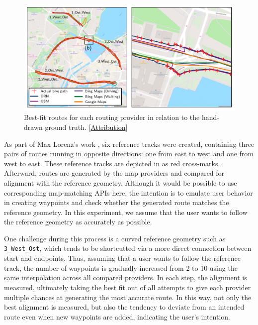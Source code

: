 \begin{figure}[t]
\centering 
\includegraphics[width=\linewidth]{images/routing-hand-drawn-ground-truth.pdf}
\caption{Best-fit routes for each routing provider in relation to the hand-drawn ground truth. [\hyperref[attribution]{Attribution}]}
\label{fig:routing-hand-drawn-ground-truth}
\end{figure}

As part of Max Lorenz's work \cite{lorenz_2022}, six reference tracks were created, containing three pairs of routes running in opposite directions: one from east to west and one from west to east. These reference tracks are depicted in  as red cross-marks. Afterward, routes are generated by the map providers and compared for alignment with the reference geometry. Although it would be possible to use corresponding map-matching APIs here, the intention is to emulate user behavior in creating waypoints and check whether the generated route matches the reference geometry. In this experiment, we assume that the user wants to follow the reference geometry as accurately as possible.

One challenge during this process is a curved reference geometry such as \texttt{3\_West\_Ost}, which tends to be shortcutted via a more direct connection between start and endpoints. Thus, assuming that a user wants to follow the reference track, the number of waypoints is gradually increased from 2 to 10 using the same interpolation across all compared providers. In each step, the alignment is measured, ultimately taking the best fit out of all attempts to give each provider multiple chances at generating the most accurate route. In this way, not only the best alignment is measured, but also the tendency to deviate from an intended route even when new waypoints are added, indicating the user's intention.

